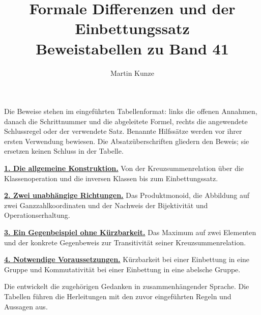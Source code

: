 \documentclass[main.tex]{subfiles}
\title{Formale Differenzen und der Einbettungssatz\\[.5em]\large Beweistabellen zu Band 41}
\author{Martin Kunze}
\date{}
\begin{document}
\hypersetup{pageanchor=false}
\maketitle
\hypersetup{pageanchor=true,hypertexnames=false}
\hypertarget{differences.proofs}{}
\par\medskip
Die Beweise stehen im eingeführten Tabellenformat: links die offenen
Annahmen, danach die Schrittnummer und die abgeleitete Formel,
rechts die angewendete Schlussregel oder der verwendete Satz.
Benannte Hilfssätze werden vor ihrer ersten Verwendung bewiesen.
Die Absatzüberschriften gliedern den Beweis; sie ersetzen keinen
Schluss in der Tabelle.

\medskip\noindent\textbf{\hyperlink{differences.statement.GroupCompletionPairCarrier}{1. Die allgemeine Konstruktion.}}
Von der Kreuzsummenrelation über die Klassenoperation und die inversen
Klassen bis zum Einbettungssatz.

\medskip\noindent\textbf{\hyperlink{differences.statement.FDProductCoordinates}{2. Zwei unabhängige Richtungen.}}
Das Produktmonoid, die Abbildung auf zwei Ganzzahlkoordinaten und
der Nachweis der Bijektivität und Operationserhaltung.

\medskip\noindent\textbf{\hyperlink{differences.statement.FDMaxCarrier}{3. Ein Gegenbeispiel ohne Kürzbarkeit.}}
Das Maximum auf zwei Elementen und der konkrete Gegenbeweis
zur Transitivität seiner Kreuzsummenrelation.

\medskip\noindent\textbf{\hyperlink{differences.statement.FDNecessaryGroupLeftCancellation}{4. Notwendige Voraussetzungen.}}
Kürzbarkeit bei einer Einbettung in eine Gruppe und Kommutativität
bei einer Einbettung in eine abelsche Gruppe.

\medskip Die \DifferencesReadingLink{} entwickelt die zugehörigen
Gedanken in zusammenhängender Sprache. Die Tabellen führen die
Herleitungen mit den zuvor eingeführten Regeln und Aussagen aus.
\clearpage






\end{document}
